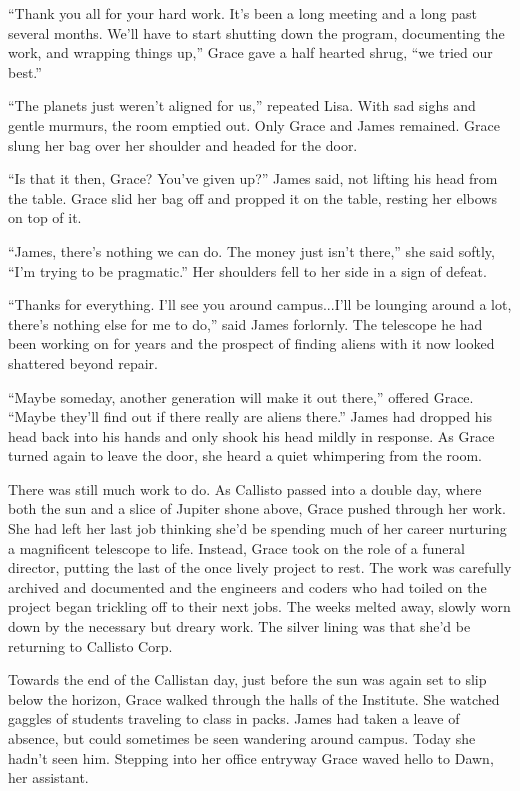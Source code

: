 \documentclass[12pt]{article} %
\begin{document}
``Thank you all for your hard work. It's been a long meeting and a long past several months. We'll have to start shutting down the program, documenting the work, and wrapping things up,'' Grace gave a half hearted shrug, ``we tried our best.''

``The planets just weren't aligned for us,'' repeated Lisa. With sad sighs and gentle murmurs, the room emptied out. Only Grace and James remained. Grace slung her bag over her shoulder and headed for the door.

``Is that it then, Grace? You've given up?'' James said, not lifting his head from the table. Grace slid her bag off and propped it on the table, resting her elbows on top of it.

``James, there's nothing we can do. The money just isn't there,'' she said softly, ``I'm trying to be pragmatic.'' Her shoulders fell to her side in a sign of defeat.

``Thanks for everything. I'll see you around campus...I'll be lounging around a lot, there's nothing else for me to do,'' said James forlornly. The telescope he had been working on for years and the prospect of finding aliens with it now looked shattered beyond repair. 

``Maybe someday, another generation will make it out there,'' offered Grace. ``Maybe they'll find out if there really are aliens there.'' James had dropped his head back into his hands and only shook his head mildly in response. As Grace turned again to leave the door, she heard a quiet whimpering from the room.

There was still much work to do. As Callisto passed into a double day, where both the sun and a slice of Jupiter shone above, Grace pushed through her work. She had left her last job thinking she'd be spending much of her career nurturing a magnificent telescope to life. Instead, Grace took on the role of a funeral director, putting the last of the once lively project to rest. The work was carefully archived and documented and the engineers and coders who had toiled on the project began trickling off to their next jobs. The weeks melted away, slowly worn down by the necessary but dreary work. The silver lining was that she'd be returning to Callisto Corp.

Towards the end of the Callistan day, just before the sun was again set to slip below the horizon, Grace walked through the halls of the Institute. She watched gaggles of students traveling to class in packs. James had taken a leave of absence, but could sometimes be seen wandering around campus. Today she hadn't seen him. Stepping into her office entryway Grace waved hello to Dawn, her assistant.
\end{document}

